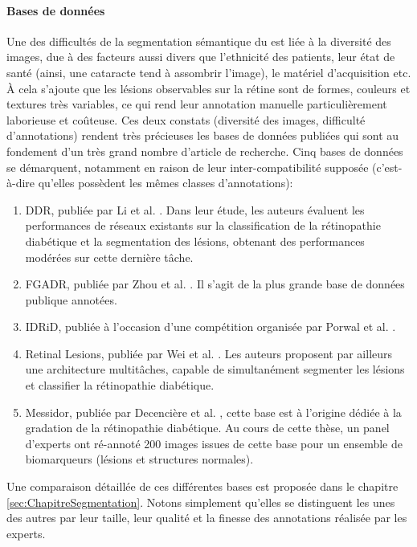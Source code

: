 \paragraph{Bases de données} Une des difficultés de la segmentation sémantique du \fundus{} est liée à la diversité des images, due à des facteurs aussi divers que l'ethnicité des patients, leur état de santé (ainsi, une cataracte tend à assombrir l'image), le matériel d'acquisition etc. À cela s'ajoute que les lésions observables sur la rétine sont de formes, couleurs et textures très variables, ce qui rend leur annotation manuelle particulièrement laborieuse et coûteuse. Ces deux constats (diversité des images, difficulté d'annotations) rendent très précieuses les bases de données publiées qui sont au fondement d'un très grand nombre d'article de recherche. Cinq bases de données se démarquent, notamment en raison de leur inter-compatibilité supposée (c'est-à-dire qu'elles possèdent les mêmes classes d'annotations):
\begin{enumerate}
	\item \ac{DDR}, publiée par Li et al. \cite{liDiagnosticAssessmentDeep2019a}. Dans leur étude, les auteurs évaluent les performances de réseaux existants sur la classification de la rétinopathie diabétique et la segmentation des lésions, obtenant des performances modérées sur cette dernière tâche.
	\item \ac{FGADR}, publiée par Zhou et al. \cite{zhouBenchmarkStudyingDiabetic2021}. Il s'agit de la plus grande base de données publique annotées.
	\item \ac{IDRiD}, publiée à l'occasion d'une compétition organisée par Porwal et al. \cite{porwalIDRiDDiabeticRetinopathy2020}. 
	\item Retinal Lesions, publiée par Wei et al. \cite{weiLearnSegmentRetinal2021}. Les auteurs proposent par ailleurs une architecture multitâches, capable de simultanément segmenter les lésions et classifier la rétinopathie diabétique.
	\item Messidor, publiée par Decencière et al. \cite{decenciereFEEDBACKPUBLICLYDISTRIBUTED2014b}, cette base est à l'origine dédiée à la gradation de la rétinopathie diabétique. Au cours de cette thèse, un panel d'experts ont ré-annoté 200 images issues de cette base pour un ensemble de biomarqueurs (lésions et structures normales). 
\end{enumerate}

Une comparaison détaillée de ces différentes bases est proposée dans le chapitre \ref{sec:ChapitreSegmentation}. Notons simplement qu'elles se distinguent les unes des autres par leur taille, leur qualité et la finesse des annotations réalisée par les experts.
